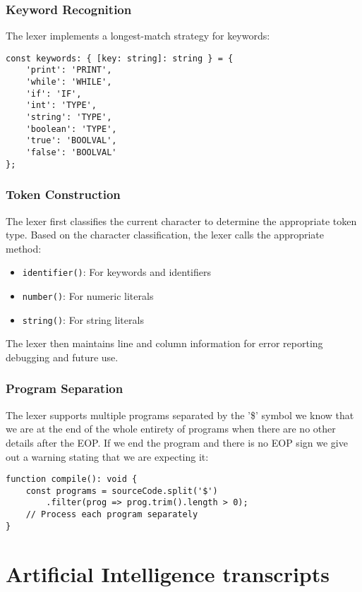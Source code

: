 \documentclass[12pt]{article}
\begin{document}
\subsubsection{Keyword Recognition}
The lexer implements a longest-match strategy for keywords:

\begin{lstlisting}
const keywords: { [key: string]: string } = {
    'print': 'PRINT',
    'while': 'WHILE',
    'if': 'IF',
    'int': 'TYPE',
    'string': 'TYPE',
    'boolean': 'TYPE',
    'true': 'BOOLVAL',
    'false': 'BOOLVAL'
};
\end{lstlisting}

\subsubsection{Token Construction}
The lexer first classifies the current character to determine the appropriate token type. Based on the character classification, the lexer calls the appropriate method:
\begin{itemize}
    \item \texttt{identifier()}: For keywords and identifiers
    \item \texttt{number()}: For numeric literals
    \item \texttt{string()}: For string literals
\end{itemize}

The lexer then maintains line and column information for error reporting debugging and future use.

\subsubsection{Program Separation}
The lexer supports multiple programs separated by the '\$' symbol we know that we are at the end of the whole entirety of programs when there are no other details after the EOP. If we end the program and there is no EOP sign we give out a warning stating that we are expecting it:

\begin{lstlisting}
function compile(): void {
    const programs = sourceCode.split('$')
        .filter(prog => prog.trim().length > 0);
    // Process each program separately
}
\end{lstlisting}

\section{Artificial Intelligence transcripts}
\end{document}
